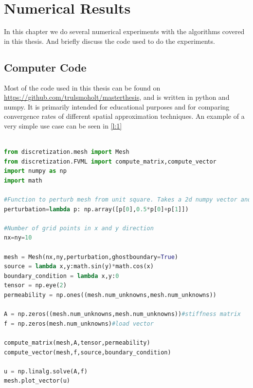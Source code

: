 \documentclass[../Main/main.tex]{subfiles}
\begin{document}
\graphicspath{{../numerical results/figs/}}
		\chapter{Numerical Results}
		\label{chap:numerical results}
		In this chapter we do several numerical experiments with the algorithms covered in this thesis. And briefly discuss the code used to do the experiments.
		\section{Computer Code}
		Most of the code used in this thesis can be found on \href{https://github.com/trulsmoholt/masterthesis}{https://github.com/trulsmoholt/masterthesis}, and is written in python and numpy. It is primarily intended for educational purposes and for comparing convergence rates of different spatial approximation techniques. An example of a very simple use case can be seen in \ref{l:1} \\
		\begin{minipage}{\linewidth}
			\begin{lstlisting}[language=Python,caption=Solving simple Poisson equation.,label=l:1]

from discretization.mesh import Mesh
from discretization.FVML import compute_matrix,compute_vector
import numpy as np
import math

#Function to perturb mesh from unit square. Takes a 2d numpy vector and returns a 2d numpy vector. This particular choice makes a paralellogram mesh.
perturbation=lambda p: np.array([p[0],0.5*p[0]+p[1]])

#Number of grid points in x and y direction
nx=ny=10

mesh = Mesh(nx,ny,perturbation,ghostboundary=True)
source = lambda x,y:math.sin(y)*math.cos(x)
boundary_condition = lambda x,y:0
tensor = np.eye(2)
permeability = np.ones((mesh.num_unknowns,mesh.num_unknowns))

A = np.zeros((mesh.num_unknowns,mesh.num_unknowns))#stiffness matrix
f = np.zeros(mesh.num_unknowns)#load vector

compute_matrix(mesh,A,tensor,permeability)
compute_vector(mesh,f,source,boundary_condition)

u = np.linalg.solve(A,f)
mesh.plot_vector(u)
			\end{lstlisting}
		\end{minipage}
		
\end{document}
